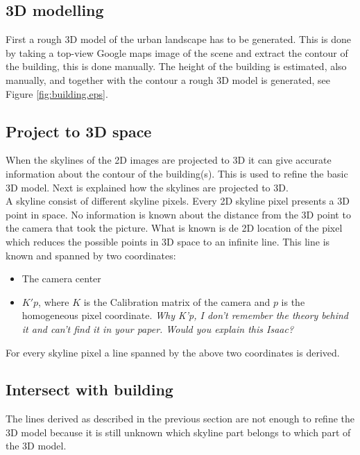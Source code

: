 \documentclass[10pt]{article}
\begin{document}



   \subsection{3D modelling}
First a rough 3D model of the urban landscape has to be generated. This is done
by taking a top-view Google maps image of the scene and extract the contour of
the building, this is done manually. 
The height of the building is estimated, also manually, and together with the
contour a rough 3D model is generated, see Figure \ref{fig:building.eps}. 


\subsection{Project to 3D space}
When the skylines of the 2D images are projected to 3D it can give 
accurate information about the contour of the building(s). This is used to
refine the basic 3D model.  Next is explained how the skylines are projected to
3D.\\

A skyline consist of different skyline pixels. Every 2D skyline pixel presents a 3D point in space. No
information is known about the distance from the 3D point to the camera that
took the picture. What is known is de 2D location of the pixel which reduces the possible points in 3D
space to an infinite line.  This line is known and spanned by two 
coordinates:\\ 
\begin{itemize}
	\item The camera center %
	\item $K'p$, where $K$ is the Calibration matrix of the camera and $p$ is the homogeneous pixel coordinate.
	\textit{Why K'p, I don't remember the theory behind it and can't find it in your paper. Would you explain this Isaac?}
\end{itemize}


For every skyline pixel a line spanned by the above two coordinates is derived.


\subsection{Intersect with building}
The lines derived as described in the previous section are not enough to refine
the 3D model because it is still unknown which skyline part belongs to which
part of the 3D model.
\end{document}
